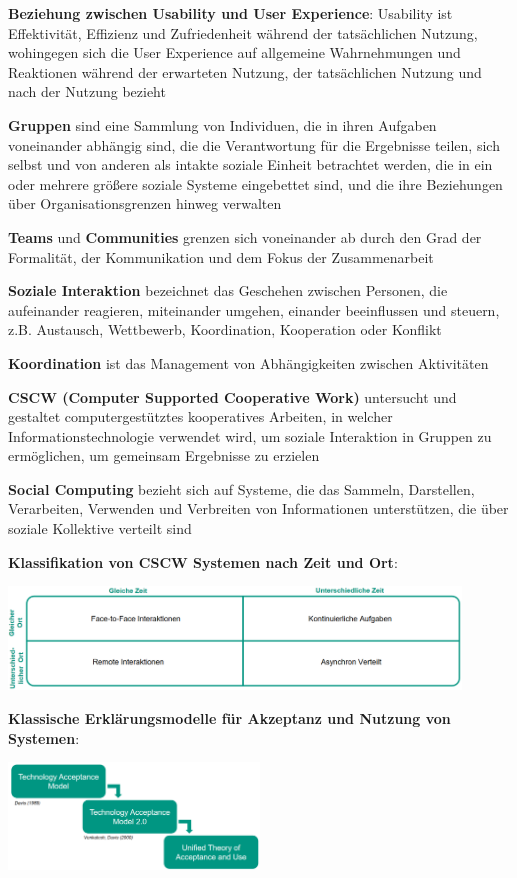 \textbf{Beziehung zwischen Usability und User Experience}:
Usability ist Effektivität, Effizienz und Zufriedenheit während der tatsächlichen Nutzung, wohingegen sich die User Experience auf allgemeine Wahrnehmungen und Reaktionen während der erwarteten Nutzung, der tatsächlichen Nutzung und nach der Nutzung bezieht

\textbf{Gruppen} sind eine Sammlung von Individuen, die in ihren Aufgaben voneinander abhängig sind, die die Verantwortung für die Ergebnisse teilen, sich selbst und von anderen als intakte soziale Einheit betrachtet werden, die in ein oder mehrere größere soziale Systeme eingebettet sind, und die ihre Beziehungen über Organisationsgrenzen hinweg verwalten

\textbf{Teams} und \textbf{Communities} grenzen sich voneinander ab durch den Grad der Formalität, der Kommunikation und dem Fokus der Zusammenarbeit

\textbf{Soziale Interaktion} bezeichnet das Geschehen zwischen Personen, die aufeinander reagieren, miteinander umgehen, einander beeinflussen und steuern, z.B. Austausch, Wettbewerb, Koordination, Kooperation oder Konflikt

\textbf{Koordination} ist das Management von Abhängigkeiten zwischen Aktivitäten

\textbf{CSCW (Computer Supported Cooperative Work)} untersucht und gestaltet computergestütztes kooperatives Arbeiten, in welcher Informationstechnologie verwendet wird, um soziale Interaktion in Gruppen zu ermöglichen, um gemeinsam Ergebnisse zu erzielen

\textbf{Social Computing} bezieht sich auf Systeme, die das Sammeln, Darstellen, Verarbeiten, Verwenden und Verbreiten von Informationen unterstützen, die über soziale Kollektive verteilt sind

\textbf{Klassifikation von CSCW Systemen nach Zeit und Ort}:
\begin{center}
	\includegraphics[width=0.9\textwidth]{images/cscw.png}
\end{center}

\pagebreak
\textbf{Klassische Erklärungsmodelle für Akzeptanz und Nutzung von Systemen}:
\begin{center}
	\includegraphics[width=0.5\textwidth]{images/e-modelle.png}
\end{center}

